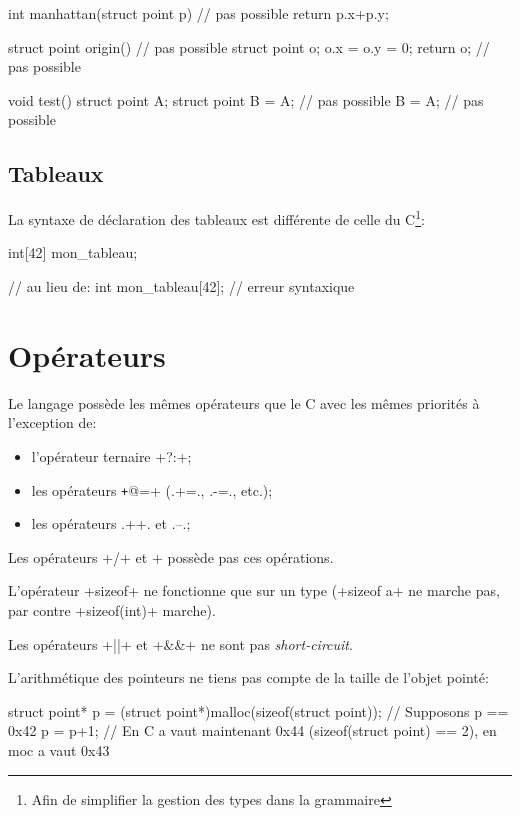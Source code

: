 \documentclass[a4paper]{article}
\begin{document}
      \begin{moc}
int manhattan(struct point p) { // pas possible
    return p.x+p.y;
}

struct point origin() { // pas possible
    struct point o;
    o.x = o.y = 0;
    return o; // pas possible
}

void test() {
    struct point A;
    struct point B = A; // pas possible
    B = A; // pas possible
}
      \end{moc}

    \subsection{Tableaux}
      La syntaxe de déclaration des tableaux est différente de celle du
      C\footnote{Afin de simplifier la gestion des types dans la grammaire}:
      \begin{moc}
int[42] mon_tableau;

// au lieu de:
int mon_tableau[42]; // erreur syntaxique
      \end{moc}

  \section{Opérateurs}
    Le langage possède les mêmes opérateurs que le C avec les mêmes priorités à
    l'exception de:
    \begin{itemize}
      \item l'opérateur ternaire \imoc+?:+;
      \item les opérateurs \texttt+@=+ (\imoc.+=., \imoc.-=., etc.);
      \item les opérateurs \imoc.++. et \imoc.--.;
    \end{itemize}

    Les opérateurs \imoc+/+ et \imoc+%
    possède pas ces opérations.

    L'opérateur \imoc+sizeof+ ne fonctionne que sur un type (\imoc+sizeof a+ ne
    marche pas, par contre \imoc+sizeof(int)+ marche).

    Les opérateurs \imoc+||+ et \imoc+&&+ ne sont pas \emph{short-circuit}.

    L'arithmétique des pointeurs ne tiens pas compte de la taille de l'objet
    pointé:
    \begin{moc}
struct point* p = (struct point*)malloc(sizeof(struct point));
// Supposons p == 0x42
p = p+1;
// En C a vaut maintenant 0x44 (sizeof(struct point) == 2), en moc a vaut 0x43
    \end{moc}
\end{document}
